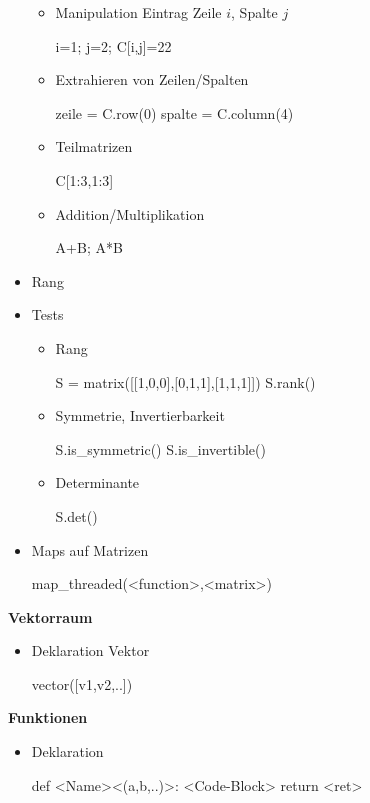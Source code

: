 \documentclass[a4paper,9pt,DIV15,twocolumn]{scrartcl}
\begin{document}
\begin{itemize}
\begin{itemize}
\item Manipulation Eintrag Zeile $i$, Spalte $j$
\begin{sagein}
i=1; j=2; C[i,j]=22
\end{sagein}
\item Extrahieren von Zeilen/Spalten
\begin{sagein}
zeile = C.row(0)
spalte = C.column(4)
\end{sagein}
\item Teilmatrizen
\begin{sagein}
C[1:3,1:3]
\end{sagein}
\item Addition/Multiplikation
\begin{sagein}
A+B; A*B
\end{sagein}
\end{itemize}
\item Rang
\item Tests
\begin{itemize}
 \item Rang 
\begin{sagein}
S = matrix([[1,0,0],[0,1,1],[1,1,1]])
S.rank()
\end{sagein}
\item Symmetrie, Invertierbarkeit
\begin{sagein}
S.is_symmetric() 
S.is_invertible()
\end{sagein}
\item Determinante
\begin{sagein}
S.det()
\end{sagein}
\end{itemize}
\item Maps auf Matrizen
\begin{sagein}
map_threaded(<function>,<matrix>)
\end{sagein}
\end{itemize}

\textbf{Vektorraum}

\begin{itemize}
 \item Deklaration Vektor
\begin{sagein}
vector([v1,v2,..]) 
\end{sagein}

\end{itemize}

\textbf{Funktionen}

\begin{itemize}
 \item Deklaration
\begin{sagein}
def <Name><(a,b,..)>:
    <Code-Block>
    return <ret>
\end{sagein}
\end{itemize}
\end{document}
